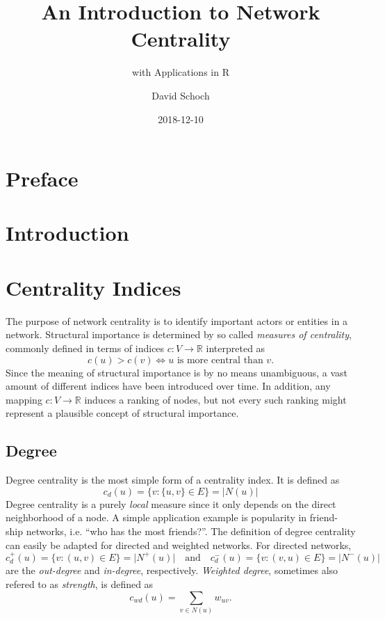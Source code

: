 \documentclass[]{book}
\title{An Introduction to Network Centrality}
\subtitle{with Applications in R}
\author{David Schoch}
\date{2018-12-10}
\theoremstyle{definition}
\theoremstyle{definition}
\theoremstyle{definition}
\theoremstyle{remark}
\begin{document}
\maketitle

{
\setcounter{tocdepth}{1}
\tableofcontents
}
\hypertarget{preface}{%
\chapter*{Preface}\label{preface}}

\hypertarget{intro}{%
\chapter{Introduction}\label{intro}}

\hypertarget{indices}{%
\chapter{Centrality Indices}\label{indices}}

The purpose of network centrality is to identify important actors or
entities in a network. Structural importance is determined by so called
\emph{measures of centrality}, commonly defined in terms of indices
\(c: V \to \mathbb{R}\) interpreted as \[
c(u) > c(v) \iff u \text{ is more central than } v.
\] Since the meaning of structural importance is by no means
unambiguous, a vast amount of different indices have been introduced
over time. In addition, any mapping \(c: V \to \mathbb{R}\) induces a
ranking of nodes, but not every such ranking might represent a plausible
concept of structural importance.

\hypertarget{degree}{%
\section{Degree}\label{degree}}

Degree centrality is the most simple form of a centrality index. It is
defined as \[
c_d(u) = \{v : \{u,v\} \in E\} = \lvert N(u) \rvert
\] Degree centrality is a purely \emph{local} measure since it only
depends on the direct neighborhood of a node. A simple application
example is popularity in friend- ship networks, i.e. ``who has the most
friends?''. The definition of degree centrality can easily be adapted
for directed and weighted networks. For directed networks, \[
c_d^+(u)=\{v : (u,v) \in E\} = \lvert N^+(u) \rvert \quad \text{and} \quad 
c_d^-(u)=\{v : (v,u) \in E\} = \lvert N^-(u) \rvert
\] are the \emph{out-degree} and \emph{in-degree}, respectively.
\emph{Weighted degree}, sometimes also refered to as \emph{strength}, is
defined as \[
c_{wd}(u)=\sum_{v \in N(u)} w_{uv}.
\]
\end{document}

